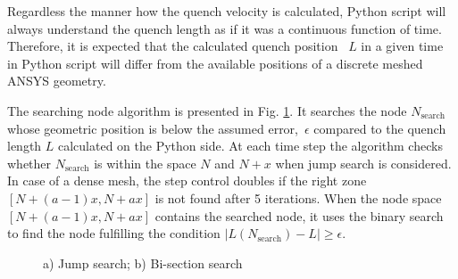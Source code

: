 
Regardless the manner how the quench velocity is calculated, Python script will always understand the quench length as if it was a continuous function of time. Therefore, it is expected that the calculated quench position ~$L$ in a given time in Python script will differ from the available positions of a discrete meshed ANSYS geometry. 

The searching node algorithm is presented in Fig. \ref{fig:node_search_algo}. It searches the node $N_\text{search}$ whose geometric position is below the assumed error,~$\epsilon$ compared to the quench length $L$ calculated on the Python side. At each time step the algorithm checks whether $N_\text{search}$ is within the space $N$ and ${N+x}$ when jump search is considered. In case of a dense mesh, the step control doubles if the right zone ${[N+(a-1)x, N+ax]}$ is not found after 5 iterations. When the node space ${[N+(a-1)x, N+ax]}$ contains the searched node, it uses the binary search to find the node fulfilling the condition ${\mid L(N_\text{search}) - L \mid \geq \epsilon}$. 

\begin{figure}[H]
\centering
{}
\caption{ a) Jump search; b) Bi-section search}
\label{fig:node_search_algo}
\end{figure}

